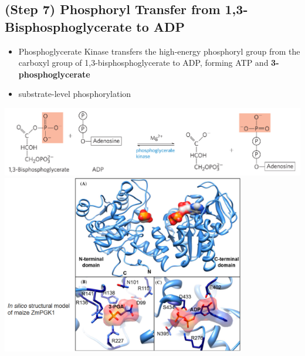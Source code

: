 \documentclass[10pt]{article}
\begin{document}
\subsection*{(Step 7) Phosphoryl Transfer from 1,3-Bisphosphoglycerate to ADP}
\begin{itemize}
	\item Phosphoglycerate Kinase transfers the high-energy phosphoryl group from the carboxyl group of 1,3-bisphosphoglycerate to ADP, forming ATP and \textbf{3-phosphoglycerate}
	\item substrate-level phosphorylation
\end{itemize}
\begin{center} 
	\includegraphics*[width=\textwidth]{L1_14.png}\\
    \includegraphics*[width=0.8\textwidth]{L1_15.png}
\end{center}
\end{document}
